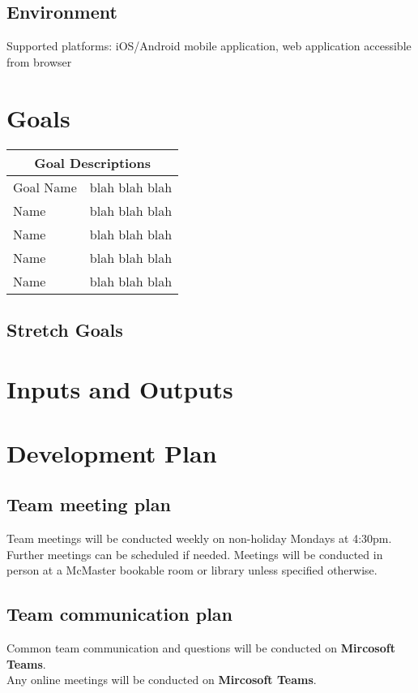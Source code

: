 \documentclass{article}
\begin{document}
\subsection{Environment}
Supported platforms: iOS/Android mobile application, web application accessible from browser


\section{Goals}

	\begin{tabular}{ |p{5cm}|p{8cm}| }
	\hline
	\multicolumn{2}{|c|}{Goal Descriptions} \\
	\hline
	Goal Name & blah blah blah \\
	\hline
	Name & blah blah blah \\
	\hline
	Name & blah blah blah \\
	\hline
	Name & blah blah blah \\
	\hline
	Name & blah blah blah \\
	\hline
\end{tabular}

\subsection{Stretch Goals}

\section{Inputs and Outputs}

\section {Development Plan}

\subsection{Team meeting plan}
Team meetings will be conducted weekly on non-holiday Mondays at 4:30pm.
Further meetings can be scheduled if needed.
Meetings will be conducted in person at a McMaster bookable room or library unless specified otherwise.

\subsection{Team communication plan}
Common team communication and questions will be conducted on \textbf{Mircosoft Teams}.\\
Any online meetings will be conducted on \textbf{Mircosoft Teams}. \\
\end{document}
